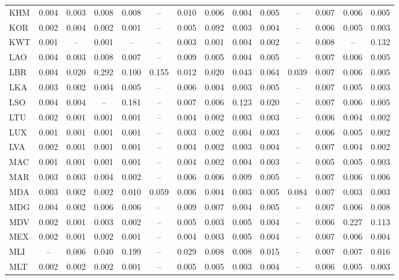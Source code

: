 \begin{longtable}{l*{13}{c}}
KHM & 0.004 & 0.003 & 0.008 & 0.008 & -- & 0.010 & 0.006 & 0.004 & 0.005 & -- & 0.007 & 0.006 & 0.005 \\
KOR & 0.002 & 0.004 & 0.002 & 0.001 & -- & 0.005 & 0.092 & 0.003 & 0.004 & -- & 0.006 & 0.005 & 0.003 \\
KWT & 0.001 & -- & 0.001 & -- & -- & 0.003 & 0.001 & 0.004 & 0.002 & -- & 0.008 & -- & 0.132 \\
LAO & 0.004 & 0.003 & 0.008 & 0.007 & -- & 0.009 & 0.005 & 0.004 & 0.005 & -- & 0.007 & 0.006 & 0.005 \\
LBR & 0.004 & 0.020 & 0.292 & 0.100 & 0.155 & 0.012 & 0.020 & 0.043 & 0.064 & 0.039 & 0.007 & 0.006 & 0.005 \\
LKA & 0.003 & 0.002 & 0.004 & 0.005 & -- & 0.006 & 0.004 & 0.003 & 0.005 & -- & 0.007 & 0.005 & 0.003 \\
LSO & 0.004 & 0.004 & -- & 0.181 & -- & 0.007 & 0.006 & 0.123 & 0.020 & -- & 0.007 & 0.006 & 0.005 \\
LTU & 0.002 & 0.001 & 0.001 & 0.001 & -- & 0.004 & 0.002 & 0.003 & 0.003 & -- & 0.006 & 0.004 & 0.002 \\
LUX & 0.001 & 0.001 & 0.001 & 0.001 & -- & 0.003 & 0.002 & 0.004 & 0.003 & -- & 0.006 & 0.005 & 0.002 \\
LVA & 0.002 & 0.001 & 0.001 & 0.001 & -- & 0.004 & 0.002 & 0.003 & 0.004 & -- & 0.007 & 0.004 & 0.002 \\
MAC & 0.001 & 0.001 & 0.001 & 0.001 & -- & 0.004 & 0.002 & 0.004 & 0.003 & -- & 0.005 & 0.005 & 0.003 \\
MAR & 0.003 & 0.003 & 0.004 & 0.002 & -- & 0.006 & 0.006 & 0.009 & 0.005 & -- & 0.007 & 0.006 & 0.006 \\
MDA & 0.003 & 0.002 & 0.002 & 0.010 & 0.059 & 0.006 & 0.004 & 0.003 & 0.005 & 0.084 & 0.007 & 0.003 & 0.003 \\
MDG & 0.004 & 0.002 & 0.006 & 0.006 & -- & 0.009 & 0.007 & 0.004 & 0.005 & -- & 0.007 & 0.006 & 0.008 \\
MDV & 0.002 & 0.001 & 0.003 & 0.002 & -- & 0.005 & 0.003 & 0.005 & 0.004 & -- & 0.006 & 0.227 & 0.113 \\
MEX & 0.002 & 0.001 & 0.002 & 0.001 & -- & 0.004 & 0.003 & 0.005 & 0.004 & -- & 0.007 & 0.006 & 0.004 \\
MLI & -- & 0.006 & 0.040 & 0.199 & -- & 0.029 & 0.008 & 0.008 & 0.015 & -- & 0.007 & 0.007 & 0.016 \\
MLT & 0.002 & 0.002 & 0.002 & 0.001 & -- & 0.005 & 0.005 & 0.003 & 0.004 & -- & 0.006 & 0.005 & 0.003 \\

\end{longtable}
